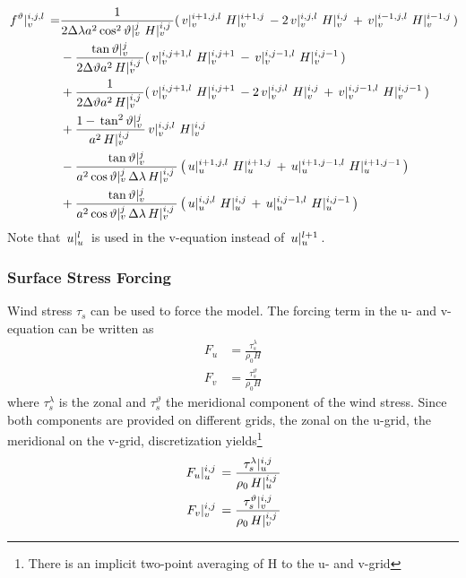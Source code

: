 \documentclass[a4paper]{article}
\begin{document}
\begin{equation}
  \begin{split}
    \,{f^\vartheta}\vert_{v}^{{i},{j},{l}}\, =&
    \frac1{2\Delta\lambda a^2\,{\cos^2\vartheta}\vert_{v}^{{j}}\,\,{H}\vert_{v}^{{i},{j}}\,}(\,{v}\vert_{v}^{{i+1},{j},{l}}\,\,{H}\vert_{v}^{{i+1},{j}}\,-2\,{v}\vert_{v}^{{i},{j},{l}}\,\,{H}\vert_{v}^{{i},{j}}\,+\,{v}\vert_{v}^{{i-1},{j},{l}}\,\,{H}\vert_{v}^{{i-1},{j}}\,)\\
    &-\frac{\,{\tan\vartheta}\vert_{v}^{{j}}\,}{2\Delta\vartheta a^2\,{H}\vert_{v}^{{i},{j}}\,}(\,{v}\vert_{v}^{{i},{j+1},{l}}\,\,{H}\vert_{v}^{{i},{j+1}}\,-\,{v}\vert_{v}^{{i},{j-1},{l}}\,\,{H}\vert_{v}^{{i},{j-1}}\,)\\
    &+\frac1{2\Delta\vartheta a^2\,{H}\vert_{v}^{{i},{j}}\,}(\,{v}\vert_{v}^{{i},{j+1},{l}}\,\,{H}\vert_{v}^{{i},{j+1}}\,-2\,{v}\vert_{v}^{{i},{j},{l}}\,\,{H}\vert_{v}^{{i},{j}}\,+\,{v}\vert_{v}^{{i},{j-1},{l}}\,\,{H}\vert_{v}^{{i},{j-1}}\,)\\
    &+\frac{1-\,{\tan^2\vartheta}\vert_{v}^{{j}}\,}{a^2\,{H}\vert_{v}^{{i},{j}}\,}\,{v}\vert_{v}^{{i},{j},{l}}\,\,{H}\vert_{v}^{{i},{j}}\,\\
    &-\frac{\,{\tan\vartheta}\vert_{v}^{{j}}\,}{a^2\,{\cos\vartheta}\vert_{v}^{{j}}\,\Delta\lambda\,{H}\vert_{v}^{{i},{j}}\,}\left(\,{u}\vert_{u}^{{i+1},{j},{l}}\,\,{H}\vert_{u}^{{i+1},{j}}\,+\,{u}\vert_{u}^{{i+1},{j-1},{l}}\,\,{H}\vert_{u}^{{i+1},{j-1}}\,\right)\\
    &+\frac{\,{\tan\vartheta}\vert_{v}^{{j}}\,}{a^2\,{\cos\vartheta}\vert_{v}^{{j}}\,\Delta\lambda\,{H}\vert_{v}^{{i},{j}}\,}\left(\,{u}\vert_{u}^{{i},{j},{l}}\,\,{H}\vert_{u}^{{i},{j}}\,+\,{u}\vert_{u}^{{i},{j-1},{l}}\,\,{H}\vert_{u}^{{i},{j-1}}\,\right)
  \end{split}
\end{equation}
Note that $\,{u}\vert_{u}^{{l}}\,$ is used in the v-equation instead of $\,{u}\vert_{u}^{{l+1}}\,$.


\subsubsection{Surface Stress Forcing}
Wind stress $\tau_s$ can be used to force the model. The forcing term in the u- and v-equation can be written as
\begin{align}
  F_u &= \frac{\tau_s^\lambda}{\rho_0H} \\
  F_v &= \frac{\tau_s^\vartheta}{\rho_0H}
\end{align}
where $\tau_s^\lambda$ is the zonal and $\tau_s^\vartheta$ the meridional component of the wind stress. Since both components are provided on different grids, the zonal on the u-grid, the meridional on the v-grid, discretization yields\footnote{There is an implicit two-point averaging of H to the u- and v-grid}
\begin{align}
  \,{F_u}\vert_{u}^{{i},{j}}\, &= \frac{\,{\tau_s^\lambda}\vert_{u}^{{i},{j}}\,}{\rho_0\,{H}\vert_{u}^{{i},{j}}\,} \\
  \,{F_v}\vert_{v}^{{i},{j}}\, &= \frac{\,{\tau_s^\vartheta}\vert_{v}^{{i},{j}}\,}{\rho_0\,{H}\vert_{v}^{{i},{j}}\,}
\end{align}
\end{document}
